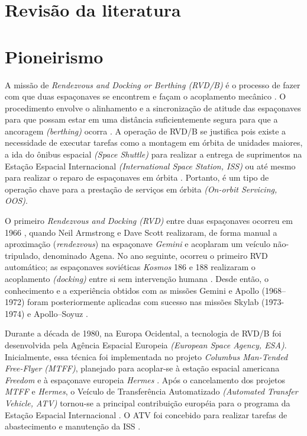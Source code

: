 \section{Revisão da literatura}


\section{Pioneirismo}

A missão de \emph{Rendezvous and Docking or Berthing (RVD/B)} é o processo de fazer com que duas espaçonaves se encontrem \cite{merriamRendezvous} e façam o acoplamento mecânico \cite{merriamDocking}.
O procedimento envolve o alinhamento e a sincronização de atitude das espaçonaves para que possam estar em uma distância suficientemente segura para que a ancoragem \emph{(berthing)} ocorra \cite{merriamBerthing}.
A operação de RVD/B se justifica pois existe a necessidade de executar tarefas como a montagem em órbita de unidades maiores, a ida do ônibus espacial \emph{(Space Shuttle)} para realizar a entrega de suprimentos na Estação Espacial Internacional \emph{(International Space Station, ISS)} ou até mesmo para realizar o reparo de espaçonaves em órbita \cite{fehse2003}.
Portanto, é um tipo de operação chave para a prestação de serviços em órbita \emph{(On-orbit Servicing, OOS)}.

O primeiro \emph{Rendezvous and Docking (RVD)} entre duas espaçonaves ocorreu em 1966 \cite{nasa1stDocking}, quando Neil Armstrong e Dave Scott realizaram, de forma manual a aproximação (\emph{rendezvous}) na espaçonave \emph{Gemini} e acoplaram um veículo não-tripulado, denominado Agena.
No ano seguinte, ocorreu o primeiro RVD automático; as espaçonaves soviéticas \emph{Kosmos} 186 e 188 realizaram o acoplamento \emph{(docking)} entre si sem intervenção humana \cite{nasaAutmaticDocking1967}.
Desde então, o conhecimento e a experiência obtidos com as missões Gemini e Apollo (1968--1972) foram posteriormente aplicadas com sucesso nas missões Skylab (1973-1974) e Apollo--Soyuz \cite{goodman2011rendezvous}.

Durante a década de 1980, na Europa Ocidental, a tecnologia de RVD/B foi desenvolvida pela Agência Espacial Europeia \emph{(European Space Agency, ESA)}.
Inicialmente, essa técnica foi implementada no projeto \emph{Columbus Man-Tended Free-Flyer (MTFF)}, planejado para acoplar-se à estação espacial americana \emph{Freedom} \cite{goelz1992MtffFreedom} e à espaçonave europeia \emph{Hermes} \cite{worldspaceflightMTFF}.
Após o cancelamento dos projetos \emph{MTFF} e \emph{Hermes}, o Veículo de Transferência Automatizado \emph{(Automated Transfer Vehicle, ATV)} tornou-se a principal contribuição européia para o programa da Estação Espacial Internacional \cite{ellwood2007ATV2ISS}. O ATV foi concebido para realizar tarefas de abastecimento e manutenção da ISS \cite{atvDLR}.

